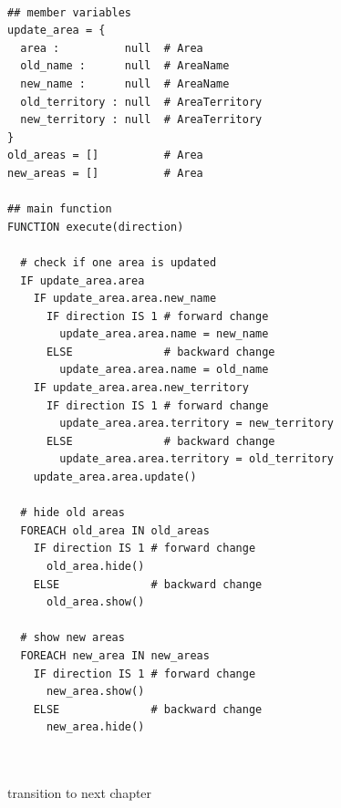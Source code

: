 \begin{lstlisting}[language=pseudocode,
  caption=class HGOperation]

## member variables
update_area = {
  area :          null  # Area
  old_name :      null  # AreaName
  new_name :      null  # AreaName
  old_territory : null  # AreaTerritory
  new_territory : null  # AreaTerritory
}
old_areas = []          # Area
new_areas = []          # Area

## main function
FUNCTION execute(direction)

  # check if one area is updated
  IF update_area.area
    IF update_area.area.new_name
      IF direction IS 1 # forward change
        update_area.area.name = new_name
      ELSE              # backward change
        update_area.area.name = old_name
    IF update_area.area.new_territory
      IF direction IS 1 # forward change
        update_area.area.territory = new_territory
      ELSE              # backward change
        update_area.area.territory = old_territory
    update_area.area.update()

  # hide old areas
  FOREACH old_area IN old_areas
    IF direction IS 1 # forward change
      old_area.hide()
    ELSE              # backward change
      old_area.show()

  # show new areas
  FOREACH new_area IN new_areas
    IF direction IS 1 # forward change
      new_area.show()
    ELSE              # backward change
      new_area.hide()



\end{lstlisting}




\vspace{2em}
transition to next chapter

